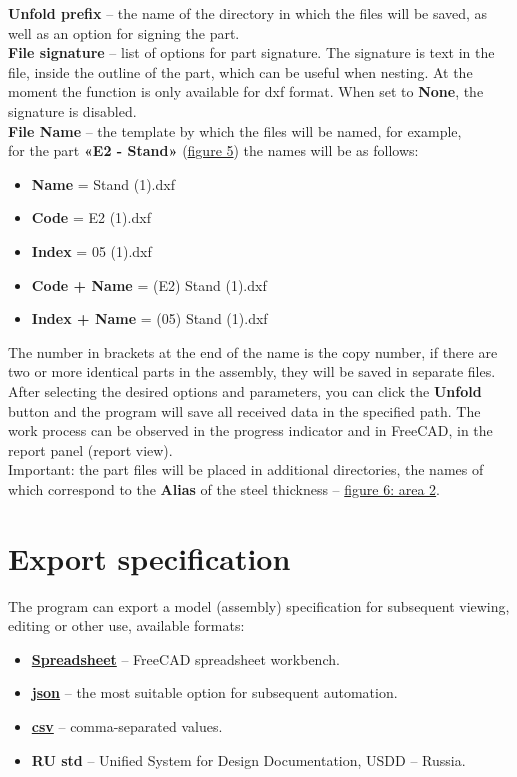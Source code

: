 \documentclass[a4paper,12pt]{article}
\begin{document}
\textbf{Unfold prefix} -- the name of the directory in which the files will be saved, as well as an option for signing the part.\\

\textbf{File signature} -- list of options for part signature. The signature is text in the file, inside the outline of the part, which can be useful when nesting. At the moment the function is only available for dxf format. When set to \textbf{None}, the signature is disabled.\\

\textbf{File Name} -- the template by which the files will be named, for example,\\for the part \textbf{«E2 - Stand»} (\hyperref[sec:properties]{figure 5}) the names will be as follows:
\begin{itemize}
	\item \textbf{Name} = Stand (1).dxf
	\item \textbf{Code} = E2 (1).dxf
	\item \textbf{Index} = 05 (1).dxf
	\item \textbf{Code + Name} = (E2) Stand (1).dxf
	\item \textbf{Index + Name} = (05) Stand (1).dxf
\end{itemize}

The number in brackets at the end of the name is the copy number, if there are two or more identical parts in the assembly, they will be saved in separate files.\\

After selecting the desired options and parameters, you can click the \textbf{Unfold} button and the program will save all received data in the specified path. The work process can be observed in the progress indicator and in FreeCAD, in the report panel (report view).\\

Important: the part files will be placed in additional directories, the names of which correspond to the \textbf{Alias} of the steel thickness -- \hyperref[sec:pref_sm]{figure 6: area 2}.

\pagebreak




\section{Export specification}

The program can export a model (assembly) specification for subsequent viewing, editing or other use, available formats:
\begin{itemize}
	\item \href{https://wiki.freecad.org/Spreadsheet_Workbench}{\textbf{Spreadsheet}} -- FreeCAD spreadsheet workbench.
	\item \href{https://ru.wikipedia.org/wiki/JSON}{\textbf{json}} -- the most suitable option for subsequent automation.
	\item \href{https://en.wikipedia.org/wiki/Comma-separated_values}{\textbf{csv}} -- comma-separated values.
	\item \textbf{RU std} -- Unified System for Design Documentation, USDD -- Russia.
\end{itemize}
\end{document}
